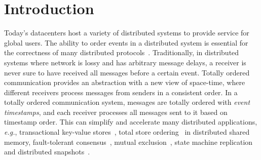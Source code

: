 \section{Introduction}
\label{sec:intro}

Today’s datacenters host a variety of distributed systems to provide service for global users.
The ability to order events in a distributed system is essential for the correctness of many distributed protocols~\cite{lamport1978time,chandy1985distributed}.
Traditionally, in distributed systems where network is lossy and has arbitrary message delays, a receiver is never sure to have received all messages before a certain event.
Totally ordered communication provides an abstraction with a new view of space-time, 
where different receivers process messages from senders in a consistent order.%
In a totally ordered communication system, messages are totally ordered with \textit{event timestamps}, and each receiver processes all messages sent to it based on timestamp order. This can simplify and accelerate many distributed applications, \textit{e.g.}, transactional key-value stores~\cite{ports2015designing, eris}, total store ordering~\cite{sewell2010x86} in distributed shared memory, fault-tolerant consensus~\cite{li2016just}, mutual exclusion~\cite{lamport1978time}, state machine replication~\cite{lamport1978time,lamport1978implementation} and distributed snapshots~\cite{chandy1985distributed}.

